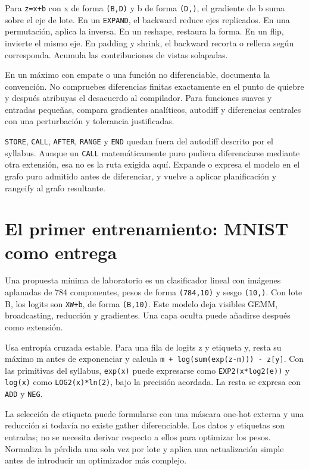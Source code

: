 \documentclass[12pt,a4paper,oneside]{report}
\begin{document}
Para \texttt{z=x+b} con x de forma \texttt{(B,D)} y b de forma \texttt{(D,)}, el gradiente de b suma sobre el eje de lote. En un \texttt{EXPAND}, el backward reduce ejes replicados. En una permutación, aplica la inversa. En un reshape, restaura la forma. En un flip, invierte el mismo eje. En padding y shrink, el backward recorta o rellena según corresponda. Acumula las contribuciones de vistas solapadas.

En un máximo con empate o una función no diferenciable, documenta la convención. No compruebes diferencias finitas exactamente en el punto de quiebre y después atribuyas el desacuerdo al compilador. Para funciones suaves y entradas pequeñas, compara gradientes analíticos, autodiff y diferencias centrales con una perturbación y tolerancia justificadas.

\texttt{STORE}, \texttt{CALL}, \texttt{AFTER}, \texttt{RANGE} y \texttt{END} quedan fuera del autodiff descrito por el syllabus. Aunque un \texttt{CALL} matemáticamente puro pudiera diferenciarse mediante otra extensión, esa no es la ruta exigida aquí. Expande o expresa el modelo en el grafo puro admitido antes de diferenciar, y vuelve a aplicar planificación y rangeify al grafo resultante.

\section{El primer entrenamiento: MNIST como entrega}
Una propuesta mínima de laboratorio es un clasificador lineal con imágenes aplanadas de 784 componentes, pesos de forma \texttt{(784,10)} y sesgo \texttt{(10,)}. Con lote B, los logits son \texttt{XW+b}, de forma \texttt{(B,10)}. Este modelo deja visibles GEMM, broadcasting, reducción y gradientes. Una capa oculta puede añadirse después como extensión.

Usa entropía cruzada estable. Para una fila de logits z y etiqueta y, resta su máximo m antes de exponenciar y calcula \texttt{m + log(sum(\allowbreak{}exp(z-m))) -\allowbreak{} z[y]}. Con las primitivas del syllabus, \texttt{exp(x)} puede expresarse como \texttt{EXP2(x*log2(e))} y \texttt{log(x)} como \texttt{LOG2(x)*ln(2)}, bajo la precisión acordada. La resta se expresa con \texttt{ADD} y \texttt{NEG}.

La selección de etiqueta puede formularse con una máscara one-hot externa y una reducción si todavía no existe gather diferenciable. Los datos y etiquetas son entradas; no se necesita derivar respecto a ellos para optimizar los pesos. Normaliza la pérdida una sola vez por lote y aplica una actualización simple antes de introducir un optimizador más complejo.
\end{document}
